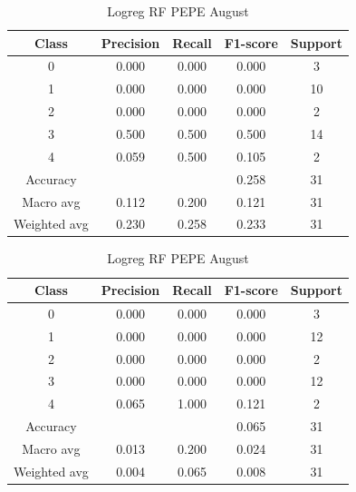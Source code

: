 \begin{enumerate}
\begin{enumerate}
                \begin{table}[H]
                \centering
                \scriptsize
                \begin{minipage}{0.48\textwidth}
                \centering
                \begin{tabular}{c|cccc}
                \hline
                Class & Precision & Recall & F1-score & Support \\
                \hline
                0 & 0.000 & 0.000 & 0.000 & 3 \\
                1 & 0.000 & 0.000 & 0.000 & 10 \\
                2 & 0.000 & 0.000 & 0.000 & 2 \\
                3 & 0.500 & 0.500 & 0.500 & 14 \\
                4 & 0.059 & 0.500 & 0.105 & 2 \\
                \hline
                Accuracy &       &      & 0.258 & 31 \\
                Macro avg & 0.112 & 0.200 & 0.121 & 31 \\
                Weighted avg & 0.230 & 0.258 & 0.233 & 31 \\
                \hline
                \end{tabular}
                \caption{Logreg RF DOGE August}
                \label{tab:classifier_2_report_logreg_rf_trump_non_filtered_aug}
                \end{minipage}%
                \hfill
                \begin{minipage}{0.48\textwidth}
                \centering
                \begin{tabular}{c|cccc}
                \hline
                Class & Precision & Recall & F1-score & Support \\
                \hline
                0 & 0.000 & 0.000 & 0.000 & 3 \\
                1 & 0.000 & 0.000 & 0.000 & 12 \\
                2 & 0.000 & 0.000 & 0.000 & 2 \\
                3 & 0.000 & 0.000 & 0.000 & 12 \\
                4 & 0.065 & 1.000 & 0.121 & 2 \\
                \hline
                Accuracy &       &      & 0.065 & 31 \\
                Macro avg & 0.013 & 0.200 & 0.024 & 31 \\
                Weighted avg & 0.004 & 0.065 & 0.008 & 31 \\
                \hline
                \end{tabular}
                \caption{Logreg RF PEPE August}
                \label{tab:classifier_2_report_logreg_rf_pepe_non_filtered_aug}
                \end{minipage}
                

\end{table}
\end{enumerate}
\end{enumerate}

